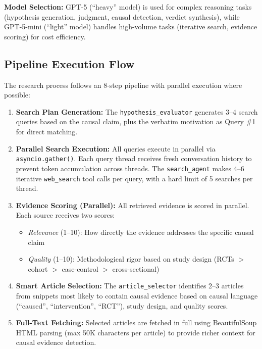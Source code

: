 \textbf{Model Selection:} GPT-5 (``heavy'' model) is used for complex reasoning tasks (hypothesis generation, judgment, causal detection, verdict synthesis), while GPT-5-mini (``light'' model) handles high-volume tasks (iterative search, evidence scoring) for cost efficiency.



\subsection{Pipeline Execution Flow}

The research process follows an 8-step pipeline with parallel execution where possible:

\begin{enumerate}[noitemsep]
    \item \textbf{Search Plan Generation:} The \texttt{hypothesis\_evaluator} generates 3--4 search queries based on the causal claim, plus the verbatim motivation as Query \#1 for direct matching.
    
    \item \textbf{Parallel Search Execution:} All queries execute in parallel via \texttt{asyncio.gather()}. Each query thread receives fresh conversation history to prevent token accumulation across threads. The \texttt{search\_agent} makes 4--6 iterative \texttt{web\_search} tool calls per query, with a hard limit of 5 searches per thread.
    
    \item \textbf{Evidence Scoring (Parallel):} All retrieved evidence is scored in parallel. Each source receives two scores:
    \begin{itemize}[noitemsep]
        \item \textit{Relevance} (1--10): How directly the evidence addresses the specific causal claim
        \item \textit{Quality} (1--10): Methodological rigor based on study design (RCTs $>$ cohort $>$ case-control $>$ cross-sectional)
    \end{itemize}
    
    \item \textbf{Smart Article Selection:} The \texttt{article\_selector} identifies 2--3 articles from snippets most likely to contain causal evidence based on causal language (``caused'', ``intervention'', ``RCT''), study design, and quality scores.
    
    \item \textbf{Full-Text Fetching:} Selected articles are fetched in full using BeautifulSoup HTML parsing (max 50K characters per article) to provide richer context for causal evidence detection.
    

\end{enumerate}
